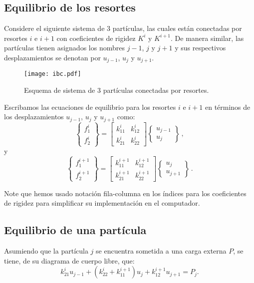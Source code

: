 \subsection{Equilibrio de los resortes}

Considere el siguiente sistema de 3 partículas, las cuales están conectadas por 
resortes $i$ e $i+1$ con coeficientes de rigidez $K^i$ y $K^{i+1}$. De manera 
similar, las partículas tienen asignados los nombres $j-1$, $j$ y $j+1$ y sus 
respectivos desplazamientos se denotan por $u_{j-1}$, $u_{j}$ y $u_{j+1}$.
\begin{figure}[H]
\centering
\texttt{[image: ibc.pdf]}
\caption{Esquema de sistema de 3 partículas conectadas por resortes.}
\label{fig:ibc}
\end{figure}


Escribamos las ecuaciones de equilibrio para los resortes $i$ e $i+1$ en 
términos de los desplazamientos $u_{j - 1}$, $u_j$ y $u_{j + 1}$ como:
$$\begin{Bmatrix} f_1^i\\ f_2^i \end{Bmatrix}
= \begin{bmatrix}
k_{11}^i & k_{12}^i\\
k_{21}^i & k_{22}^i
\end{bmatrix}
\begin{Bmatrix} u_{j - 1}\\ u_j \end{Bmatrix}\, ,$$
y
$$\begin{Bmatrix} f_1^{i + 1}\\ f_2^{i + 1}\end{Bmatrix}
= \begin{bmatrix}
k_{11}^{i + 1} & k_{12}^{i + 1}\\
k_{21}^{i + 1} & k_{22}^{i + 1} \end{bmatrix}
\begin{Bmatrix} u_j\\ u_{j + 1} \end{Bmatrix}\, .$$

Note que hemos usado notación fila-columna en los índices para los coeficientes 
de rigidez para simplificar su implementación en el computador.


\subsection{Equilibrio de una partícula}
Asumiendo que la partícula $j$ se encuentra sometida a una carga externa $P$, 
se tiene, de su diagrama de cuerpo libre, que:
$$
k_{21}^i u_{j - 1} + (k_{22}^i + k_{11}^{i + 1}) u_j + k_{12}^{i + 1} u_{j + 1} 
= P_j.
$$

